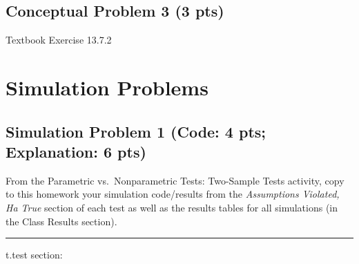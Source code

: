 \documentclass[
]{article}
\begin{document}
\hypertarget{conceptual-problem-3-3-pts}{%
\subsection{Conceptual Problem 3 (3
pts)}\label{conceptual-problem-3-3-pts}}

Textbook Exercise 13.7.2

\hypertarget{simulation-problems}{%
\section{Simulation Problems}\label{simulation-problems}}

\hypertarget{simulation-problem-1-code-4-pts-explanation-6-pts}{%
\subsection{Simulation Problem 1 (Code: 4 pts; Explanation: 6
pts)}\label{simulation-problem-1-code-4-pts-explanation-6-pts}}

From the Parametric vs.~Nonparametric Tests: Two-Sample Tests activity,
copy to this homework your simulation code/results from the
\emph{Assumptions Violated, Ha True} section of each test as well as the
results tables for all simulations (in the Class Results section).

\begin{center}\rule{0.5\linewidth}{0.5pt}\end{center}

t.test section:
\end{document}
